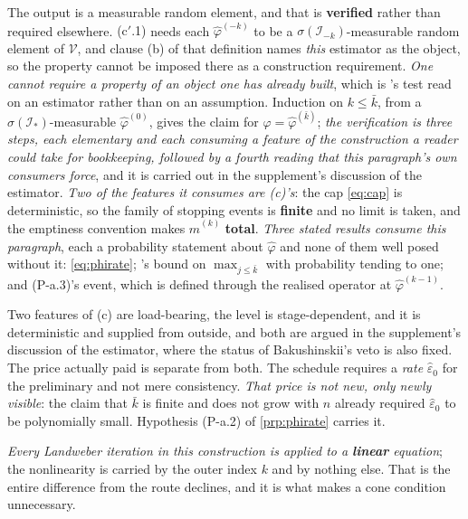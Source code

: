 \begin{definition}
The output is a measurable random element, and that is \textbf{verified} rather than required
elsewhere. \textup{(c$'$.1)} needs each $\hat\varphi^{(-k)}$ to be a
$\sigma(\mathcal I_{-k})$-measurable random element of $\mathcal V$, and clause \textup{(b)} of that
definition names \emph{this} estimator as the object, so the property cannot be imposed there as a
construction requirement. \emph{One cannot require a property of an object one has already built}, which is
's test read on an estimator rather than on an assumption. Induction on
$k\le\bar k$, from a $\sigma(\mathcal I_\ast)$-measurable $\hat\varphi^{(0)}$, gives the claim for
$\hat\varphi=\hat\varphi^{(\bar k)}$; \emph{the verification is three steps, each elementary and each
consuming a feature of the construction a reader could take for bookkeeping, followed by a fourth reading
that this paragraph's own consumers force}, and it is carried out in the supplement's discussion of the
estimator. \emph{Two of the features it consumes are \textup{(c)}'s}: the cap \eqref{eq:cap} is
deterministic, so the family of stopping events is \textbf{finite} and no limit is taken, and the emptiness
convention makes $\hat m^{(k)}$ \textbf{total}. \emph{Three stated results consume this paragraph}, each a
probability statement about $\hat\varphi$ and none of them well posed without it: \eqref{eq:phirate};
's bound on $\max_{j\le\bar k}$ with probability tending to one; and (P-a.3)'s
event, which is defined through the realised operator at $\hat\varphi^{(k-1)}$.

Two features of \textup{(c)} are load-bearing, the level is stage-dependent, and it is
deterministic and supplied from outside, and both are argued in the supplement's discussion of the
estimator, where the status of Bakushinskii's veto is also fixed. The price actually paid is
separate from both. The schedule requires a \emph{rate}
$\hat\varepsilon_0$ for the preliminary and not mere consistency. \emph{That price is not new, only
newly visible}: the claim that $\bar k$ is finite and does not grow with $n$ already required
$\hat\varepsilon_0$ to be polynomially small. Hypothesis (P-a.2) of \cref{prp:phirate} carries it.

\emph{Every Landweber iteration in this construction is applied to a \textbf{linear} equation}; the
nonlinearity is carried by the outer index $k$ and by nothing else. That is the entire difference from
the route  declines, and it is what makes a cone condition unnecessary.
\end{definition}

